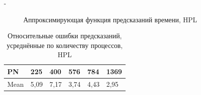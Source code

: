 \documentclass[unicode, t, 11pt]{beamer}%
\newlength{\mylen}
\begin{document}
\begin{frame}
\begin{columns}[T]
\begin{column}{\dimexpr\textwidth-\mylen}
\begin{figure}
						\caption{Аппроксимирующая функция предсказаний времени, HPL}
						\label{figure_HPL_C_3}
					\end{figure}
		 			\begin{table}
			 			\captionsetup{font=tiny, labelfont=tiny}
			 			\tiny
							\begin{tabularx}{\textwidth}{|X|X|X|X|X|X|}%
								\hline
								  PN &  225 &  400 &  576 &  784 & 1369 \\ \hline
								Mean & 5,09 & 7,17 & 3,74 & 4,43 & 2,95 \\ \hline
							\end{tabularx}
						\caption{Относительные ошибки предсказаний, усреднённые по количеству процессов, HPL}
					\end{table}
				\end{column}
	 		\end{columns}
	 	\end{frame}
					
\end{document}
